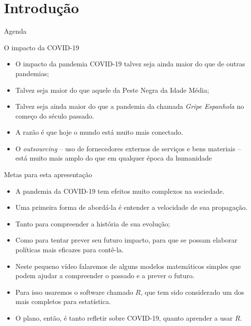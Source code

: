 \documentclass[a4paper,10pt]{beamer}
\begin{document}
\begin{frame}
  
\end{frame}

\section{Introdução}

\begin{frame}{Agenda}
 \tableofcontents
\end{frame}

\begin{frame}{O impacto da COVID-19}
  \begin{itemize}
      \item O impacto da pandemia COVID-19 talvez seja ainda maior do que de 
	  outras pandemias;
      \item Talvez seja maior do que aquele da Peste Negra da Idade Média;
      \item Talvez seja ainda maior do que a pandemia da chamada 
	  {\em Gripe Espanhola} no começo do século passado.
      \item A razão é que hoje o mundo está muito mais conectado.
      \item O {\em outsourcing} -- uso de fornecedores externos de serviços e
	  bens materiais -- está muito 
	  mais amplo do que em qualquer época da humanidade
  \end{itemize}

\end{frame}

\begin{frame}{Metas para esta apresentação}
  \begin{itemize}
      \item A pandemia da COVID-19 tem efeitos muito complexos na sociedade.
      \item Uma primeira forma de abordá-la é entender a velocidade de sua 
	  propagação.
      \item Tanto para compreender a história de sua evolução;
      \item Como para tentar prever seu futuro impacto, para que se possam
	  elaborar políticas mais eficazes para contê-la.
	  
      \item Neste pequeno vídeo falaremos de alguns modelos matemáticos simples
	  que podem ajudar a compreender o passado e a prever o futuro.
      \item Para isso usaremos o software chamado $R$, que tem sido considerado
	  um dos mais completos para estatística.
      \item O plano, então, é tanto refletir sobre COVID-19, quanto aprender 
	  a usar $R$.
  \end{itemize}

\end{frame}
\end{document}
